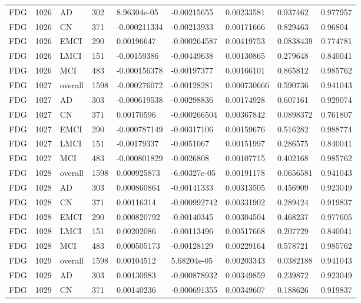 \begin{landscape}
\begin{longtable}{lllllllll}
FDG & 1026 & AD & 302 & 8.96304e-05 & -0.00215655 & 0.00233581 & 0.937462 & 0.977957 \\
FDG & 1026 & CN & 371 & -0.000211334 & -0.00213933 & 0.00171666 & 0.829463 & 0.96804 \\
FDG & 1026 & EMCI & 290 & 0.00196647 & -0.000264587 & 0.00419753 & 0.0838439 & 0.774781 \\
FDG & 1026 & LMCI & 151 & -0.00159386 & -0.00449638 & 0.00130865 & 0.279648 & 0.840041 \\
FDG & 1026 & MCI & 483 & -0.000156378 & -0.00197377 & 0.00166101 & 0.865812 & 0.985762 \\
FDG & 1027 & overall & 1598 & -0.000276072 & -0.00128281 & 0.000730666 & 0.590736 & 0.941043 \\
FDG & 1027 & AD & 303 & -0.000619538 & -0.00298836 & 0.00174928 & 0.607161 & 0.929074 \\
FDG & 1027 & CN & 371 & 0.00170596 & -0.000266504 & 0.00367842 & 0.0898372 & 0.761807 \\
FDG & 1027 & EMCI & 290 & -0.000787149 & -0.00317106 & 0.00159676 & 0.516282 & 0.988774 \\
FDG & 1027 & LMCI & 151 & -0.00179337 & -0.0051067 & 0.00151997 & 0.286575 & 0.840041 \\
FDG & 1027 & MCI & 483 & -0.000801829 & -0.0026808 & 0.00107715 & 0.402168 & 0.985762 \\
FDG & 1028 & overall & 1598 & 0.000925873 & -6.00327e-05 & 0.00191178 & 0.0656581 & 0.941043 \\
FDG & 1028 & AD & 303 & 0.000860864 & -0.00141333 & 0.00313505 & 0.456909 & 0.923049 \\
FDG & 1028 & CN & 371 & 0.00116314 & -0.000992742 & 0.00331902 & 0.289424 & 0.919837 \\
FDG & 1028 & EMCI & 290 & 0.000820792 & -0.00140345 & 0.00304504 & 0.468237 & 0.977605 \\
FDG & 1028 & LMCI & 151 & 0.00202086 & -0.00113496 & 0.00517668 & 0.207729 & 0.840041 \\
FDG & 1028 & MCI & 483 & 0.000505173 & -0.00128129 & 0.00229164 & 0.578721 & 0.985762 \\
FDG & 1029 & overall & 1598 & 0.00104512 & 5.68204e-05 & 0.00203343 & 0.0382188 & 0.941043 \\
FDG & 1029 & AD & 303 & 0.00130983 & -0.000878932 & 0.00349859 & 0.239872 & 0.923049 \\
FDG & 1029 & CN & 371 & 0.00140236 & -0.000691355 & 0.00349607 & 0.188626 & 0.919837 \\

\end{longtable}
\end{landscape}
